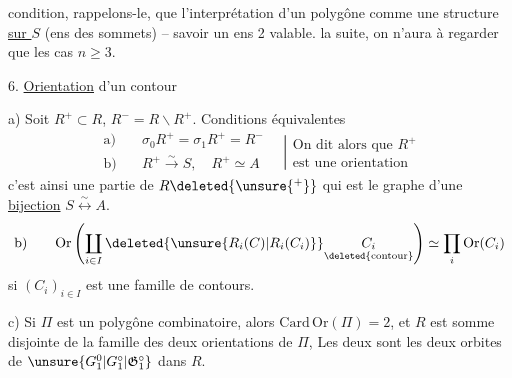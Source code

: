 condition, rappelons-le, que l'interprétation
d'un polygône comme une structure
\uline{sur $S$} (ens des sommets) -- savoir
un ens  2  
valable.  la suite, on n'aura
à regarder que les cas $n\geq3$.

6. \uline{Orientation} d'un contour

a) Soit $R^+\subset R$,  $R^-=R\smallsetminus R^+$. Conditions
équivalentes
\[
\begin{aligned}
\text{a)}\quad&\sigma_0R^+=\sigma_1R^+=R^-\\
\text{b)}\quad&R^+\xrightarrow{\sim} S,\quad R^+\simeq A
\end{aligned}
\quad\left|\begin{gathered}\text{On dit alors que }R^+\\\text{est une orientation}\end{gathered}\right.
\]
c'est ainsi une partie  de $R\deleted{\unsure{{}^+}}$ qui est le graphe
d'une \uline{bijection} $S\overset{\sim}{\longleftrightarrow} A$.
\[
\text{b)}\qquad\mathrm{Or}\left(\coprod_{i\in I}\deleted{\unsure{R_i(C)|R_i(C_i)}}\underset{\deleted{\text{contour}}}{C_i}\right)\simeq\prod_i\mathrm{Or}(C_i)
\]
si $(C_i)_{i\in I}$ est une famille de contours.

c) Si $\Pi$ est un polygône combinatoire,
alors $\mathrm{Card}\,\mathrm{Or}(\Pi)=2$, et $R$ est  somme
disjointe de la famille des deux orientations
de $\Pi$,   Les deux 
sont les deux orbites de $\unsure{G_1^{0}|G_1^\circ|\mathfrak G_1^\circ}$ dans $R$.
